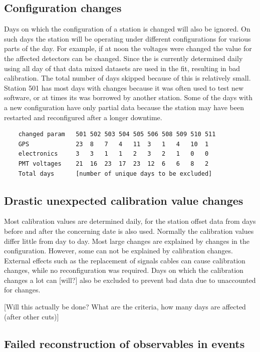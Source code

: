 \subsection{Configuration changes}

Days on which the configuration of a station is changed will also be ignored. On such days the station will be operating under different configurations for various parts of the day. For example, if at noon the \pmt voltages were changed the \mpv value for the affected detectors can be changed. Since the \mpv is currently determined daily using all day of that data mixed datasets are used in the fit, resulting in bad calibration. The total number of days skipped because of this is relatively small. Station 501 has most days with changes because it was often used to test new software, or at times its \gps was borrowed by another station. Some of the days with a new configuration have only partial data because the station may have been restarted and reconfigured after a longer downtime.

\begin{verbatim}
    changed param   501 502 503 504 505 506 508 509 510 511
    GPS             23  8   7   4   11  3   1   4   10  1
    electronics     3   3   1   1   2   3   2   1   0   0
    PMT voltages    21  16  23  17  23  12  6   6   8   2
    Total days      [number of unique days to be excluded]
\end{verbatim}


\subsection{Drastic unexpected calibration value changes}

Most calibration values are determined daily, for the station offset data from days before and after the concerning date is also used. Normally the calibration values differ little from day to day. Most large changes are explained by changes in the configuration. However, some can not be explained by calibration changes. External effects such as the replacement of signals cables can cause calibration changes, while no reconfiguration was required. Days on which the calibration changes a lot can [will?] also be excluded to prevent bad data due to unaccounted for changes.

[Will this actually be done? What are the criteria, how many days are affected (after other cuts)]


\subsection{Failed reconstruction of observables in events}

